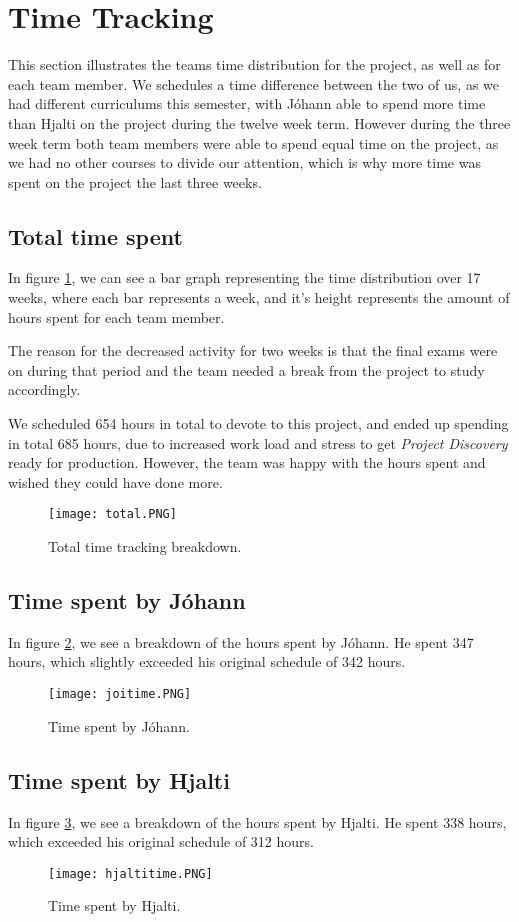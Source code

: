 \section{Time Tracking}\label{sec:timetracking}
This section illustrates the teams time distribution for the project, as well as for each team member. We schedules a time difference between the two of us, as we had different curriculums this semester, with Jóhann able to spend more time than Hjalti on the project during the twelve week term. However during the three week term both team members were able to spend equal time on the project, as we had no other courses to divide our attention, which is why more time was spent on the project the last three weeks.

\subsection{Total time spent}
In figure \ref{fig:totaltime}, we can see a bar graph representing the time distribution over 17 weeks, where each bar represents a week, and it's height represents the amount of hours spent for each team member.

The reason for the decreased activity for two weeks is that the final exams were on during that period and the team needed a break from the project to study accordingly.

We scheduled 654 hours in total to devote to this project, and ended up spending in total 685 hours, due to increased work load and stress to get \emph{Project Discovery} ready for production. However, the team was happy with the hours spent and wished they could have done more.

\begin{figure}[H]
	\centering
	\graphicspath{ {./graphics/} }
    \centerline{\texttt{[image: total.PNG]}}
    \caption{\label{fig:totaltime}Total time tracking breakdown.}
\end{figure}

\subsection{Time spent by Jóhann}
In figure \ref{fig:joitime}, we see a breakdown of the hours spent by Jóhann. He spent 347 hours, which slightly exceeded his original schedule of 342 hours.
\begin{figure}[H]
	\centering
	\graphicspath{ {./graphics/} }
    \centerline{\texttt{[image: joitime.PNG]}}
    \caption{\label{fig:joitime}Time spent by Jóhann.}
\end{figure}

\subsection{Time spent by Hjalti}
In figure \ref{fig:hjaltitime}, we see a breakdown of the hours spent by Hjalti. He spent 338 hours, which exceeded his original schedule of 312 hours. 
\begin{figure}[H]
	\centering
	\graphicspath{ {./graphics/} }
    \centerline{\texttt{[image: hjaltitime.PNG]}}
    \caption{\label{fig:hjaltitime}Time spent by Hjalti.}
\end{figure}